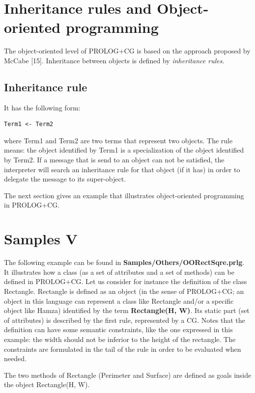 \documentclass{book}
\begin{document}
\section{Inheritance rules and Object-oriented programming}\label{Sec:InheritanceAndOOP}

The object-oriented level of PROLOG+CG is
based on the approach proposed by McCabe [15]. Inheritance between
objects is defined by {\it inheritance rules}.

\subsection{Inheritance rule} 

It has the following form:

\begin{verbatim}
Term1 <- Term2
\end{verbatim}

where Term1 and Term2 are two terms that represent two objects. The
rule means: the object identified by Term1 is a specialization of the
object identified by Term2. If a message that is send to an object can
not be satisfied, the interpreter will search an inheritance rule for
that object (if it has) in order to delegate the message to its
super-object.

The next section gives an example that illustrates object-oriented
programming in PROLOG+CG.

\section{Samples V}\label{Sec:SamplesV}

The following example can be found in {\bf
Samples/Others/OORectSqre.prlg}. It illustrates how a class (as a set
of attributes and a set of methods) can be defined in PROLOG+CG. Let
us consider for instance the definition of the class
Rectangle. Rectangle is defined as an object (in the sense of
PROLOG+CG; an object in this language can represent a class like
Rectangle and/or a specific object like Hamza) identified by the term
{\bf Rectangle(H, W)}. Its static part (set of attributes) is
described by the first rule, represented by a CG. Notes that the
definition can have some semantic constraints, like the one expressed
in this example: the width should not be inferior to the height of the
rectangle. The constraints are formulated in the tail of the rule in
order to be evaluated when needed.

The two methods of Rectangle (Perimeter and Surface) are defined as
goals inside the object Rectangle(H, W).
\end{document}
